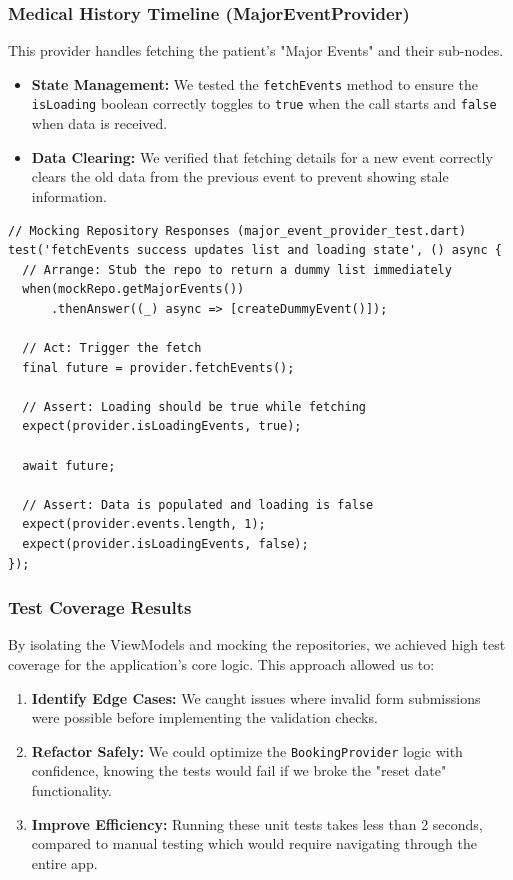 \subsubsection{Medical History Timeline (MajorEventProvider)}
This provider handles fetching the patient's "Major Events" and their
sub-nodes.
\begin{itemize}
    \item \textbf{State Management:} We tested the \texttt{fetchEvents} method to ensure the \texttt{isLoading} boolean correctly toggles to \texttt{true} when the call starts and \texttt{false} when data is received.
    \item \textbf{Data Clearing:} We verified that fetching details for a new event correctly clears the old data from the previous event to prevent showing stale information.
\end{itemize}

\begin{verbatim}
// Mocking Repository Responses (major_event_provider_test.dart)
test('fetchEvents success updates list and loading state', () async {
  // Arrange: Stub the repo to return a dummy list immediately
  when(mockRepo.getMajorEvents())
      .thenAnswer((_) async => [createDummyEvent()]);

  // Act: Trigger the fetch
  final future = provider.fetchEvents();
  
  // Assert: Loading should be true while fetching
  expect(provider.isLoadingEvents, true);

  await future;

  // Assert: Data is populated and loading is false
  expect(provider.events.length, 1);
  expect(provider.isLoadingEvents, false);
});
\end{verbatim}

\subsubsection{Test Coverage Results}
By isolating the ViewModels and mocking the repositories, we achieved high test
coverage for the application's core logic. This approach allowed us to:
\begin{enumerate}
    \item \textbf{Identify Edge Cases:} We caught issues where invalid form submissions were possible before implementing the validation checks.
    \item \textbf{Refactor Safely:} We could optimize the \texttt{BookingProvider} logic with confidence, knowing the tests would fail if we broke the "reset date" functionality.
    \item \textbf{Improve Efficiency:} Running these unit tests takes less than 2 seconds, compared to manual testing which would require navigating through the entire app.
\end{enumerate}
